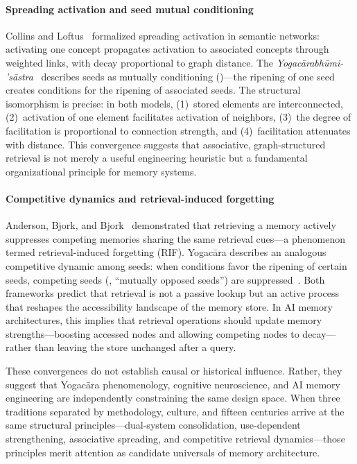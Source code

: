 \paragraph{Spreading activation and seed mutual conditioning}
Collins and Loftus~\cite{collins1975} formalized spreading activation in
semantic networks: activating one concept propagates activation to
associated concepts through weighted links, with decay proportional to
graph distance.  The
\emph{Yogac\=arabh\=umi-\\'s\=astra}~\cite{yogacarabhumi} describes
seeds as mutually conditioning ()---the ripening of one
seed creates conditions for the ripening of associated seeds.  The
structural isomorphism is precise: in both models, (1)~stored elements
are interconnected, (2)~activation of one element facilitates activation
of neighbors, (3)~the degree of facilitation is proportional to
connection strength, and (4)~facilitation attenuates with distance.
This convergence suggests that associative, graph-structured retrieval
is not merely a useful engineering heuristic but a fundamental
organizational principle for memory systems.

\paragraph{Competitive dynamics and retrieval-induced forgetting}
Anderson, Bjork, and Bjork~\cite{anderson1994} demonstrated that
retrieving a memory actively suppresses competing memories sharing the
same retrieval cues---a phenomenon termed retrieval-induced forgetting
(RIF).  Yogac\=ara describes an analogous competitive dynamic among
seeds: when conditions favor the ripening of certain seeds, competing
seeds (, ``mutually opposed seeds'') are
suppressed~\cite{chengweishilun}.  Both frameworks predict that
retrieval is not a passive lookup but an active process that reshapes
the accessibility landscape of the memory store.  In AI memory
architectures, this implies that retrieval operations should update
memory strengths---boosting accessed nodes and allowing competing nodes
to decay---rather than leaving the store unchanged after a query.

\medskip

\noindent These convergences do not establish causal or historical
influence.  Rather, they suggest that Yogac\=ara phenomenology,
cognitive neuroscience, and AI memory engineering are independently
constraining the same design space.  When three traditions separated by
methodology, culture, and fifteen centuries arrive at the same
structural principles---dual-system consolidation, use-dependent
strengthening, associative spreading, and competitive retrieval
dynamics---those principles merit attention as candidate universals of
memory architecture.
